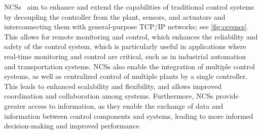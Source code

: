 \glspl{NCS}~\cite{gupta2010networked} aim to enhance and extend the capabilities of traditional control systems by decoupling the controller from the plant, sensors, and actuators and interconnecting them with general-purpose \acs{TCP}/\acs{IP} networks;
see \cref{fig:csvsncs}.
This allows for remote monitoring and control, which enhances the reliability and safety of the control system, which is particularly useful in applications where real-time monitoring and control are critical, such as in industrial automation and transportation systems.
\glspl{NCS} also enable the integration of multiple control systems, as well as centralized control of multiple plants by a single controller.
This leads to enhanced scalability and flexibility, and allows improved coordination and collaboration among systems.
Furthermore, \glspl{NCS} provide greater access to information, as they enable the exchange of data and information between control components and systems, leading to more informed decision-making and improved performance.

